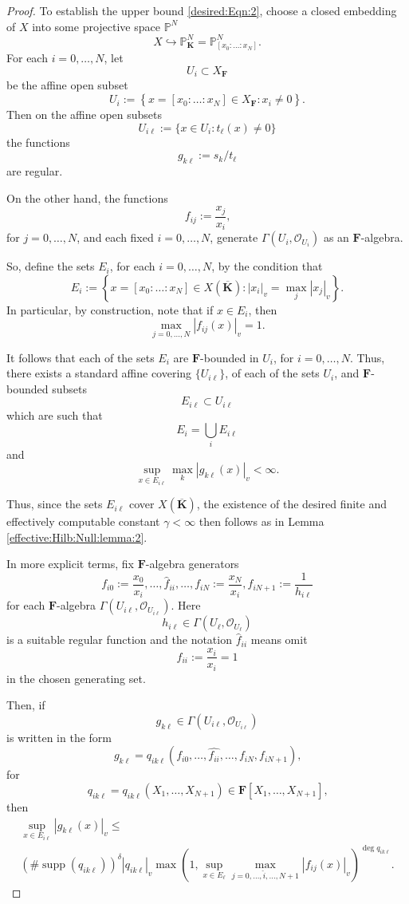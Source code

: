 \documentclass[10pt,a4paper]{amsart}
\newcommand{\FF}{\mathbf{F}}
\newcommand{\KK}{\mathbf{K}}
\newcommand{\Osh}{{\mathcal O}}                        %
\newcommand{\PP}{\mathbb{P}} %
\renewcommand{\leq}{\leqslant}
\begin{document}
\begin{proof}
To establish the upper bound \eqref{desired:Eqn:2}, choose a closed embedding of $X$ into some projective space $\PP^N$
$$
X \hookrightarrow \PP^N_{\KK} = \PP^N_{[x_0:\dots:x_N]} \text{.}
$$
For each $i=0,\dots,N$, let 
$$U_i \subset X_{\FF}$$ 
be the affine open subset
$$
U_i := \left\{ x = [x_0:\dots : x_N] \in X_{\FF} : x_i \not = 0 \right\} \text{.}
$$
Then on the affine open subsets
$$
U_{i\ell} := \{x \in U_i : t_{\ell}(x) \not = 0 \} 
$$
the functions
$$
g_{k \ell} := s_k / t_{\ell}
$$
are regular.

On the other hand, the functions
$$
f_{ij} := \frac{x_j}{x_i} \text{,}
$$
for $j = 0,\dots,N$, and each fixed $ i = 0, \dots, N$, generate $\Gamma(U_i,\Osh_{U_i})$ as an $\FF$-algebra.

So, define the sets $E_i$, for each $i = 0,\dots,N$, by the condition that
$$
E_i := \left\{ x = [x_0:\dots:x_N] \in X(\overline{\KK}) : |x_i|_v = \max_j |x_j|_v \right\} \text{.}
$$
In particular, by construction, note that if $x \in E_i$, then
$$
\max_{j=0,\dots,N} \left| f_{ij}(x) \right|_v = 1 \text{.}
$$



It follows that each of the sets $E_i$ are $\FF$-bounded in $U_i$, for $i = 0,\dots,N$.  Thus, there exists a standard affine covering $\{U_{i \ell}\}$, of each of the sets $U_i$, and $\FF$-bounded subsets
$$
E_{i \ell} \subset U_{i\ell}
$$
which are such that 
$$
E_i = \bigcup_{i} E_{i\ell}
$$
and 
$$
\sup_{x \in E_{i \ell}} \max_k \left| g_{k \ell}(x) \right|_v < \infty \text{.}
$$


Thus, since the sets $E_{i \ell}$ cover $X(\overline{\KK})$, the existence of the desired finite and effectively computable constant $\gamma < \infty$ then follows as in Lemma \ref{effective:Hilb:Null:lemma:2}.


In more explicit terms, fix $\FF$-algebra generators
$$
f_{i0} := \frac{x_0}{x_i} , \dots, \hat{f}_{ii},\dots,f_{iN}:= \frac{x_N}{x_i}, f_{iN+1} := \frac{1}{h_{i\ell}}
$$
for each $\FF$-algebra $\Gamma(U_{i\ell},\Osh_{U_{i\ell}})$.  Here
$$
h_{i\ell} \in \Gamma(U_\ell,\Osh_{U_\ell})
$$
is a suitable regular function and the notation 
$
\hat{f}_{ii} 
$
means omit
$$
f_{ii} := \frac{x_i}{x_i} = 1
$$
in the chosen generating set.

Then, if 
$$
g_{k\ell} \in \Gamma(U_{i\ell},\Osh_{U_{i\ell}})
$$
is written in the form
$$
g_{k\ell} = q_{ik\ell}(f_{i0},\dots,\hat{f_{ii}},\dots,f_{iN},f_{iN+1}) \text{,}
$$
for
$$
q_{ik\ell} = q_{ik\ell}(X_1,\dots,X_{N+1}) \in \FF[X_1,\dots,X_{N+1}] \text{,}
$$
then 
\begin{multline*}
\sup_{x \in E_{i \ell}} \left| g_{k\ell}(x) \right|_v \leq \\ 
\left( \# \operatorname{supp}(q_{ik\ell}) \right)^{\delta} \left|q_{ik\ell} \right|_v \max\left(1,\sup_{x \in E_{\ell}} \max_{j=0,\dots, \hat{i}, \dots,N+1} |f_{ij}(x)|_v\right)^{\deg q_{ik\ell}} \text{.}
\end{multline*}


\end{proof}
\end{document}
